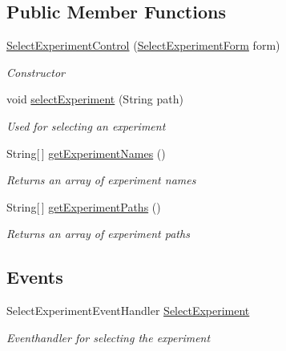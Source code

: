 \subsection*{Public Member Functions}
\begin{DoxyCompactItemize}
\item 
\hyperlink{class_web_analyzer_1_1_u_i_1_1_interaction_objects_1_1_select_experiment_control_a0ec8c7149c5fc197768a0def5c1cf3ab}{Select\+Experiment\+Control} (\hyperlink{class_web_analyzer_1_1_u_i_1_1_select_experiment_form}{Select\+Experiment\+Form} form)
\begin{DoxyCompactList}\small\item\em Constructor \end{DoxyCompactList}\item 
void \hyperlink{class_web_analyzer_1_1_u_i_1_1_interaction_objects_1_1_select_experiment_control_a1bf6dae0d6ce2c7c6dcf63dfe72e7d58}{select\+Experiment} (String path)
\begin{DoxyCompactList}\small\item\em Used for selecting an experiment \end{DoxyCompactList}\item 
String\mbox{[}$\,$\mbox{]} \hyperlink{class_web_analyzer_1_1_u_i_1_1_interaction_objects_1_1_select_experiment_control_aa7dda6b33c3fa7d8f154af6722ed61e9}{get\+Experiment\+Names} ()
\begin{DoxyCompactList}\small\item\em Returns an array of experiment names \end{DoxyCompactList}\item 
String\mbox{[}$\,$\mbox{]} \hyperlink{class_web_analyzer_1_1_u_i_1_1_interaction_objects_1_1_select_experiment_control_a51d3afa57c307c296f8a2ed27a0f106c}{get\+Experiment\+Paths} ()
\begin{DoxyCompactList}\small\item\em Returns an array of experiment paths \end{DoxyCompactList}\end{DoxyCompactItemize}
\subsection*{Events}
\begin{DoxyCompactItemize}
\item 
Select\+Experiment\+Event\+Handler \hyperlink{class_web_analyzer_1_1_u_i_1_1_interaction_objects_1_1_select_experiment_control_a7062e7537081a90d11a7c26cefe79651}{Select\+Experiment}
\begin{DoxyCompactList}\small\item\em Eventhandler for selecting the experiment \end{DoxyCompactList}\end{DoxyCompactItemize}
